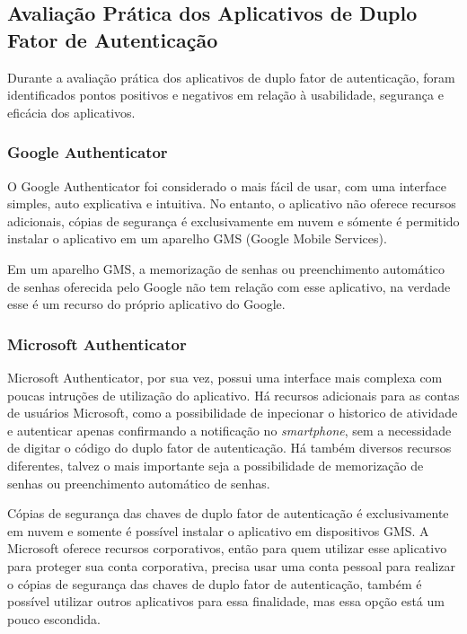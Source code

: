\documentclass[12pt]{article}
\begin{document}
\subsection{Avaliação Prática dos Aplicativos de Duplo Fator de Autenticação}

Durante a avaliação prática dos aplicativos de duplo fator de autenticação,
foram identificados pontos positivos e negativos em relação à usabilidade,
segurança e eficácia dos aplicativos.

\subsubsection{Google Authenticator}

O Google Authenticator foi considerado o mais fácil de usar, com uma
interface simples, auto explicativa e intuitiva.
No entanto, o aplicativo não oferece recursos adicionais, cópias de segurança
é exclusivamente em nuvem e sómente é permitido instalar o aplicativo em um
aparelho GMS (Google Mobile Services).

Em um aparelho GMS, a memorização de senhas ou preenchimento automático de
senhas oferecida pelo Google não tem relação com esse aplicativo, na verdade
esse é um recurso do próprio aplicativo do Google.

\subsubsection{Microsoft Authenticator}\label{sec:figs}

Microsoft Authenticator, por sua vez, possui uma interface mais complexa com
poucas intruções de utilização do aplicativo.
Há recursos adicionais para as contas de usuários Microsoft, como a possibilidade de
inpecionar o historico de atividade e autenticar apenas confirmando a notificação
no \textit{smartphone}, sem a necessidade de digitar o código do duplo fator de autenticação.
Há também diversos recursos diferentes, talvez o mais importante seja a possibilidade
de memorização de senhas ou preenchimento automático de senhas.

Cópias de segurança das chaves de duplo fator de autenticação é exclusivamente em
nuvem e somente é possível instalar o aplicativo em dispositivos GMS.
A Microsoft oferece recursos corporativos, então para quem utilizar esse
aplicativo para proteger sua conta corporativa, precisa usar uma conta pessoal
para realizar o cópias de segurança das chaves de duplo fator de autenticação, também
é possível utilizar outros aplicativos para essa finalidade, mas essa opção está um
pouco escondida.
\end{document}
